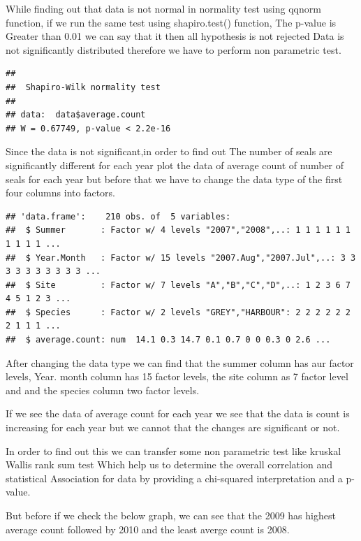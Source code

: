 \documentclass[
]{article}
\begin{document}
While finding out that data is not normal in normality test using qqnorm
function, if we run the same test using shapiro.test() function, The
p-value is Greater than 0.01 we can say that it then all hypothesis is
not rejected Data is not significantly distributed therefore we have to
perform non parametric test.

\begin{verbatim}
## 
##  Shapiro-Wilk normality test
## 
## data:  data$average.count
## W = 0.67749, p-value < 2.2e-16
\end{verbatim}

Since the data is not significant,in order to find out The number of
seals are significantly different for each year plot the data of average
count of number of seals for each year but before that we have to change
the data type of the first four columns into factors.

\begin{verbatim}
## 'data.frame':    210 obs. of  5 variables:
##  $ Summer       : Factor w/ 4 levels "2007","2008",..: 1 1 1 1 1 1 1 1 1 1 ...
##  $ Year.Month   : Factor w/ 15 levels "2007.Aug","2007.Jul",..: 3 3 3 3 3 3 3 3 3 3 ...
##  $ Site         : Factor w/ 7 levels "A","B","C","D",..: 1 2 3 6 7 4 5 1 2 3 ...
##  $ Species      : Factor w/ 2 levels "GREY","HARBOUR": 2 2 2 2 2 2 2 1 1 1 ...
##  $ average.count: num  14.1 0.3 14.7 0.1 0.7 0 0 0.3 0 2.6 ...
\end{verbatim}

After changing the data type we can find that the summer column has aur
factor levels, Year. month column has 15 factor levels, the site column
as 7 factor level and and the species column two factor levels.

If we see the data of average count for each year we see that the data
is count is increasing for each year but we cannot that the changes are
significant or not.

In order to find out this we can transfer some non parametric test like
kruskal Wallis rank sum test Which help us to determine the overall
correlation and statistical Association for data by providing a
chi-squared interpretation and a p-value.

But before if we check the below graph, we can see that the 2009 has
highest average count followed by 2010 and the least averge count is
2008.
\end{document}
